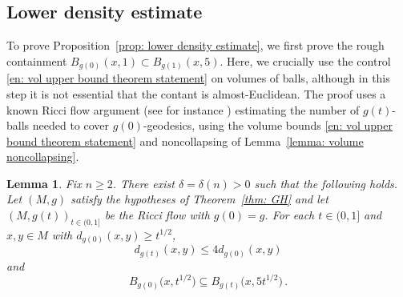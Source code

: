 \documentclass[11pt,reqno]{amsart}
\newtheorem{lemma}[theorem]{Lemma}
\theoremstyle{remark}
\theoremstyle{definition}
\numberwithin{equation}{section}
\begin{document}
\subsection{Lower density estimate}\label{s3.1}
To prove Proposition~\ref{prop: lower density estimate},  we first prove the rough containment $B_{g(0)}(x,1)\subset B_{g(1)}(x,5)$. Here, we crucially use the control \eqref{en: vol upper bound theorem statement} on volumes of balls, although in this step it is not essential that the contant is almost-Euclidean.  
The proof uses a known Ricci flow argument (see for instance  \cite{ChenWang,BZ1})  estimating the number of $g(t)$-balls needed to cover $g(0)$-geodesics, using the volume bounds \eqref{en: vol upper bound theorem statement} and noncollapsing of Lemma~\ref{lemma: volume noncollapsing}. 
\begin{lemma} 
\label{lem: ball 1} Fix $n \geq 2$.  There exist $\delta= \delta(n)>0$  such that the following holds. Let $(M,g)$ satisfy the hypotheses of Theorem~\ref{thm: GH} and let $(M, g(t))_{t \in (0,1]}$ be the Ricci flow with $g(0)=g$. 
For each  $ t\in (0,1]$ and $x, y \in M$ with $d_{g(0)}(x, y) \geq t^{1 / 2}$,
\begin{equation}
	\label{e: dd rough}
d_{g(t)}(x, y) \leq 4 d_{g(0)}(x, y) 
\end{equation}
and  
\begin{equation}\label{e: rough containment of balls}
B_{g(0)}\big(x, t^{1 / 2}\big) \subseteq B_{g(t)}\big(x, 5 t^{1 / 2}\big)\,.
\end{equation}
\end{lemma}
\end{document}
